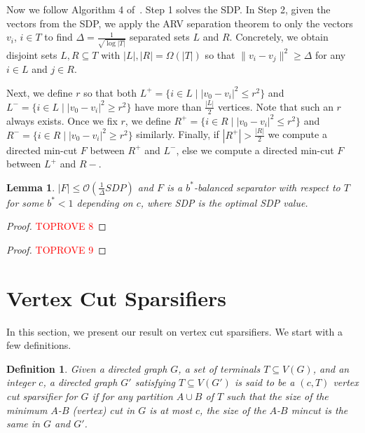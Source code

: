\documentclass[11pt]{article}
\newtheorem{lemma}[theorem]{Lemma}
\newtheorem{definition}[theorem]{Definition}
\newcommand{\OO}{\mathcal{O}}
\begin{document}
{Now we follow Algorithm 4 of~\cite{agarwal2005log}. Step 1 solves the SDP. In Step 2, given the vectors from the SDP, we apply the ARV separation theorem to only the vectors $v_i$, $i \in T$ to find $\Delta = \frac{1}{\sqrt{\log |T|}}$ separated sets $L$ and $R$. Concretely, we obtain disjoint sets $L, R \subseteq T$ with $|L|, |R| = \Omega(|T|)$ so that $\|v_i - v_j\|^2 \geq \Delta$ for any $i \in L$ and $j \in R$.


Next, we define $r$ so that  both 
$L^+ = \{i \in L \mid |v_0 - v_i|^2 \leq r^2\}$ and $L^{-} = \{i \in L \mid |v_0 - v_i|^2 \geq r^2\}$ have more than $\frac{|L|}{2}$ vertices. Note that such an $r$ always exists. Once we fix $r$, we define $R^+ = \{i \in R \mid |v_0 - v_i|^2 \leq r^2\}$ and $R^{-} = \{i \in R \mid |v_0 - v_i|^2 \geq r^2\}$ similarly. Finally, if $|R^+| > \frac{|R|}{2}$ we compute a directed min-cut $F$ between $R^+$ and $L^-$, else we compute a directed min-cut $F$ between $L^+$ and $R-$. 

\begin{lemma}\label{lemma:approx}
$|F| \leq \OO(\frac{1}{\Delta} SDP)$ and $F$ is a $b^*$-balanced separator with respect to $T$ for some $b^* < 1$ depending on $c$, where SDP is the optimal SDP value.
\end{lemma}

\begin{proof}\textcolor{red}{TOPROVE 8}\end{proof}



\begin{proof}\textcolor{red}{TOPROVE 9}\end{proof}


\section{Vertex Cut Sparsifiers}

In this section, we present our result on vertex cut sparsifiers. We start with a few definitions.


\begin{definition}
Given a directed graph $G$, a set of terminals $T \subseteq V(G)$, and an integer $c$, a directed graph $G'$ satisfying $T \subseteq V(G')$ is said to be a $(c,T)$ vertex cut sparsifier for $G$ if for any partition $A \cup B$ of $T$ such that the size of the minimum $A$-$B$ (vertex) cut in $G$ is at most $c$, the size of the $A$-$B$ mincut is the same in $G$ and $G'$.
\end{definition}


}
\end{document}
